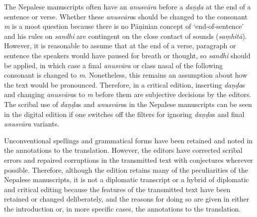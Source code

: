 
The Nepalese manuscripts often have an \emph{anusvāra} before a \emph{daṇḍa} at the end of a sentence or verse. Whether these \emph{anusvāra}s should be changed to the consonant \emph{m} is a moot question because there is no Pāṇinian concept of `end-of-sentence' and his rules on \emph{sandhi} are contingent on the close contact of  sounds (\emph{saṃhitā}). However, it is reasonable to assume that at the end of a verse, paragraph or sentence the speakers would have paused for breath or thought, so \emph{sandhi} should be applied, in which case a final \emph{anusvāra} or class nasal of the following consonant is changed to \emph{m}.  Nonetheless, this remains an assumption about how the text would be pronounced. Therefore, in a critical edition, inserting \emph{daṇḍa}s and changing \emph{anusvāra}s to \emph{m} before them are subjective decisions by the editors. The scribal use of \emph{daṇḍa}s and \emph{anusvāra}s in the Nepalese manuscripts can be seen in the digital edition if one switches off the filters for ignoring \emph{daṇḍa}s and final \emph{anusvāra} variants. 

Unconventional spellings and grammatical forms have been retained and noted in the annotations to the translation. However, the editors have corrected scribal errors and repaired corruptions in the transmitted text with conjectures wherever possible. Therefore, although the edition retains many of the peculiarities of the Nepalese manuscripts, it is not a diplomatic transcript or a hybrid of diplomatic and critical editing because the features of the transmitted text have been retained or changed deliberately, and the reasons for doing so are given in either the introduction or, in more specific cases, the annotations to the translation.

